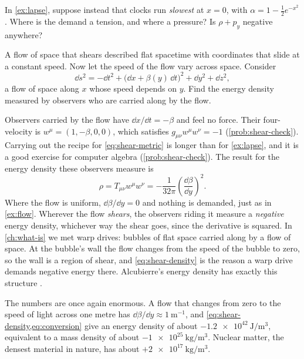 \begin{checkpoint}
In \cref{ex:lapse}, suppose instead that clocks run \emph{slowest} at $x = 0$,
with $\alpha = 1 - \tfrac12 e^{-x^{2}}$. Where is the demand a tension, and where
a pressure? Is $\rho + p_{y}$ negative anywhere?
\end{checkpoint}

\begin{example}{A flow of space that shears}\label{ex:shear}
 described flat spacetime with coordinates that slide at a
constant speed. Now let the speed of the flow vary across space. Consider
\begin{equation}
  \dd s^{2} = -\dd t^{2} + \bigl(\dd x + \beta(y)\,\dd t\bigr)^{2} + \dd y^{2} + \dd z^{2},
  \label{eq:shear-metric}
\end{equation}
a flow of space along $x$ whose speed depends on $y$. Find the energy density
measured by observers who are carried along by the flow.

\solution Observers carried by the flow have $\dd x/\dd t = -\beta$ and feel no
force. Their four-velocity is $w^{\mu} = (1, -\beta, 0, 0)$, which satisfies
$g_{\mu\nu}w^{\mu}w^{\nu} = -1$ (\cref{prob:shear-check}). Carrying out the recipe
for \cref{eq:shear-metric} is longer than for \cref{ex:lapse}, and it is a good
exercise for computer algebra (\cref{prob:shear-check}). The result for the
energy density these observers measure is
\begin{equation}
  \rho = T_{\mu\nu}w^{\mu}w^{\nu} = -\frac{1}{32\pi}\left(\frac{\dd\beta}{\dd y}\right)^{2}.
  \label{eq:shear-density}
\end{equation}
\discussion Where the flow is uniform, $\dd\beta/\dd y = 0$ and nothing is demanded,
just as in \cref{ex:flow}. Wherever the flow \emph{shears}, the observers riding
it measure a \emph{negative} energy density, whichever way the shear goes, since
the derivative is squared. In \cref{ch:what-is} we met warp drives: bubbles of
flat space carried along by a flow of space. At the bubble's wall the flow
changes from the speed of the bubble to zero, so the wall is a region of shear,
and \cref{eq:shear-density} is the reason a warp drive demands negative energy
there. Alcubierre's energy density has exactly this structure
\parencite{Alcubierre1994}.
\end{example}

The numbers are once again enormous. A flow that changes from zero to the speed
of light across one metre has $\dd\beta/\dd y \approx \SI{1}{\metre^{-1}}$, and
\cref{eq:shear-density,eq:conversion} give an energy density of about
$-\SI{1.2e42}{\joule\per\cubic\metre}$, equivalent to a mass density of about
$-\SI{1e25}{\kilogram\per\cubic\metre}$. Nuclear matter, the densest material in
nature, has about $+\SI{2e17}{\kilogram\per\cubic\metre}$.

